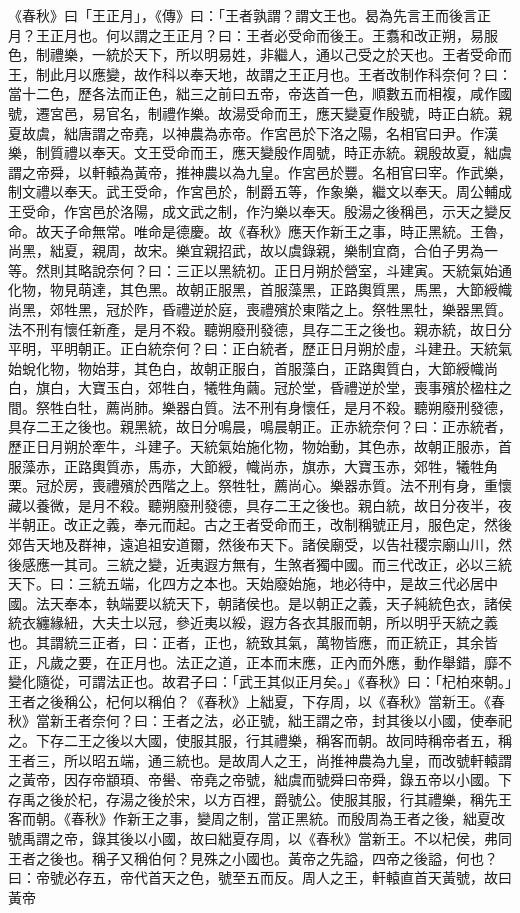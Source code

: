 《春秋》曰「王正月」，《傳》曰：「王者孰謂？謂文王也。曷為先言王而後言正月？王正月也。何以謂之王正月？曰：王者必受命而後王。王翥和改正朔，易服色，制禮樂，一統於天下，所以明易姓，非繼人，通以己受之於天也。王者受命而王，制此月以應變，故作科以奉天地，故謂之王正月也。王者改制作科奈何？曰：當十二色，歷各法而正色，絀三之前曰五帝，帝迭首一色，順數五而相複，咸作國號，遷宮邑，易官名，制禮作樂。故湯受命而王，應天變夏作殷號，時正白統。親夏故虞，絀唐謂之帝堯，以神農為赤帝。作宮邑於下洛之陽，名相官曰尹。作漢樂，制質禮以奉天。文王受命而王，應天變殷作周號，時正赤統。親殷故夏，絀虞謂之帝舜，以軒轅為黃帝，推神農以為九皇。作宮邑於豐。名相官曰宰。作武樂，制文禮以奉天。武王受命，作宮邑於，制爵五等，作象樂，繼文以奉天。周公輔成王受命，作宮邑於洛陽，成文武之制，作汋樂以奉天。殷湯之後稱邑，示天之變反命。故天子命無常。唯命是德慶。故《春秋》應天作新王之事，時正黑統。王魯，尚黑，絀夏，親周，故宋。樂宜親招武，故以虞錄親，樂制宜商，合伯子男為一等。然則其略說奈何？曰：三正以黑統初。正日月朔於營室，斗建寅。天統氣始通化物，物見萌達，其色黑。故朝正服黑，首服藻黑，正路輿質黑，馬黑，大節綬幟尚黑，郊牲黑，冠於阼，昏禮逆於庭，喪禮殯於東階之上。祭牲黑牡，樂器黑質。法不刑有懷任新產，是月不殺。聽朔廢刑發德，具存二王之後也。親赤統，故日分平明，平明朝正。正白統奈何？曰：正白統者，歷正日月朔於虛，斗建丑。天統氣始蛻化物，物始芽，其色白，故朝正服白，首服藻白，正路輿質白，大節綬幟尚白，旗白，大寶玉白，郊牲白，犧牲角繭。冠於堂，昏禮逆於堂，喪事殯於楹柱之間。祭牲白牡，薦尚肺。樂器白質。法不刑有身懷任，是月不殺。聽朔廢刑發德，具存二王之後也。親黑統，故日分鳴晨，鳴晨朝正。正赤統奈何？曰：正赤統者，歷正日月朔於牽牛，斗建子。天統氣始施化物，物始動，其色赤，故朝正服赤，首服藻赤，正路輿質赤，馬赤，大節綬，幟尚赤，旗赤，大寶玉赤，郊牲，犧牲角栗。冠於房，喪禮殯於西階之上。祭牲牡，薦尚心。樂器赤質。法不刑有身，重懷藏以養微，是月不殺。聽朔廢刑發德，具存二王之後也。親白統，故日分夜半，夜半朝正。改正之義，奉元而起。古之王者受命而王，改制稱號正月，服色定，然後郊告天地及群神，遠追祖安道爾，然後布天下。諸侯廟受，以告社稷宗廟山川，然後感應一其司。三統之變，近夷遐方無有，生煞者獨中國。而三代改正，必以三統天下。曰：三統五端，化四方之本也。天始廢始施，地必待中，是故三代必居中國。法天奉本，執端要以統天下，朝諸侯也。是以朝正之義，天子純統色衣，諸侯統衣纏緣紐，大夫士以冠，參近夷以綏，遐方各衣其服而朝，所以明乎天統之義也。其謂統三正者，曰：正者，正也，統致其氣，萬物皆應，而正統正，其余皆正，凡歲之要，在正月也。法正之道，正本而末應，正內而外應，動作舉錯，靡不變化隨從，可謂法正也。故君子曰：「武王其似正月矣。」《春秋》曰：「杞柏來朝。」王者之後稱公，杞何以稱伯？《春秋》上絀夏，下存周，以《春秋》當新王。《春秋》當新王者奈何？曰：王者之法，必正號，絀王謂之帝，封其後以小國，使奉祀之。下存二王之後以大國，使服其服，行其禮樂，稱客而朝。故同時稱帝者五，稱王者三，所以昭五端，通三統也。是故周人之王，尚推神農為九皇，而改號軒轅謂之黃帝，因存帝顓頊、帝嚳、帝堯之帝號，絀虞而號舜曰帝舜，錄五帝以小國。下存禹之後於杞，存湯之後於宋，以方百裡，爵號公。使服其服，行其禮樂，稱先王客而朝。《春秋》作新王之事，變周之制，當正黑統。而殷周為王者之後，絀夏改號禹謂之帝，錄其後以小國，故曰絀夏存周，以《春秋》當新王。不以杞侯，弗同王者之後也。稱子又稱伯何？見殊之小國也。黃帝之先謚，四帝之後謚，何也？曰：帝號必存五，帝代首天之色，號至五而反。周人之王，軒轅直首天黃號，故曰黃帝